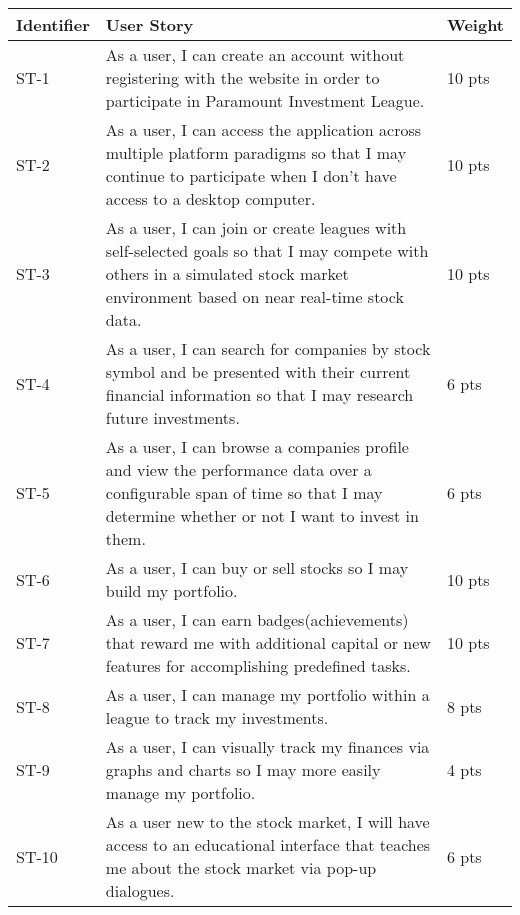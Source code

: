 \renewcommand\arraystretch{2}
\begin{longtable}{|p{0.6in}|p{4.6in}|p{0.5in}|}
\hline
{\large \color{color1}Identifier}&{\large \color{color1}User Story}&{\large
  \color{color1}Weight} \\ \hline
ST-1&As a user, I can create an account without registering with the website
in order to participate in Paramount Investment League.&10 pts \\ \hline

ST-2&As a user, I can access the application across multiple platform paradigms
so that I may continue to participate when I don't have access to a desktop
computer.&10 pts \\ \hline

ST-3&As a user, I can join or create leagues with self-selected goals so that I
may compete with others in a simulated stock market environment based on
near real-time stock data.&10 pts \\ \hline

ST-4&As a user, I can search for companies by stock symbol and be presented with
their current financial information so that I may research future investments.&6
pts  \\ \hline

ST-5&As a user, I can browse a companies profile and view the performance data
over a configurable span of time so that I may determine whether or not I want
to invest in them.&6 pts  \\ \hline

ST-6&As a user, I can buy or sell stocks so I may build my portfolio.&10 pts
\\ \hline

ST-7&As a user, I can earn badges(achievements) that reward me with additional
capital or new features for accomplishing predefined tasks.&10 pts \\ \hline

ST-8&As a user, I can manage my portfolio within a league to track my
investments.&8 pts  \\ \hline

ST-9&As a user, I can visually track my finances via graphs and charts so I may
more easily manage my portfolio.&4 pts  \\ \hline

ST-10&As a user new to the stock market, I will have access to an educational
interface that teaches me about the stock market via pop-up dialogues.&6 pts
\\ \hline


\end{longtable}
